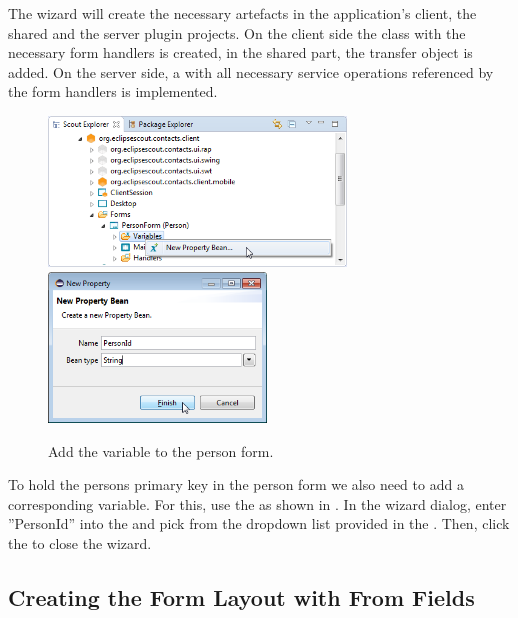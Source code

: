 \documentclass[a4paper,10pt,twoside]{book}
\begin{document}
The wizard will create the necessary artefacts in the application's client, the shared and the server plugin projects. 
On the client side the  class with the necessary form handlers is created, in the shared part, the  transfer object is added. 
On the server side, a  with all necessary service operations referenced by the form handlers is implemented. 

\begin{figure}
\includegraphics[height=4cm]{new_bean_personid_contextmenu.png} \hspace{5mm}
\includegraphics[height=4cm]{new_bean_personid.png}
\caption{Add the  variable to the person form.}
\end{figure}

To hold the persons primary key in the person form we also need to add a corresponding variable. 
For this, use the  as shown in . 
In the wizard dialog, enter ''PersonId'' into the  and pick  from the dropdown list provided in the . 
Then, click the  to close the wizard. 

\subsection{Creating the Form Layout with From Fields}
\end{document}
